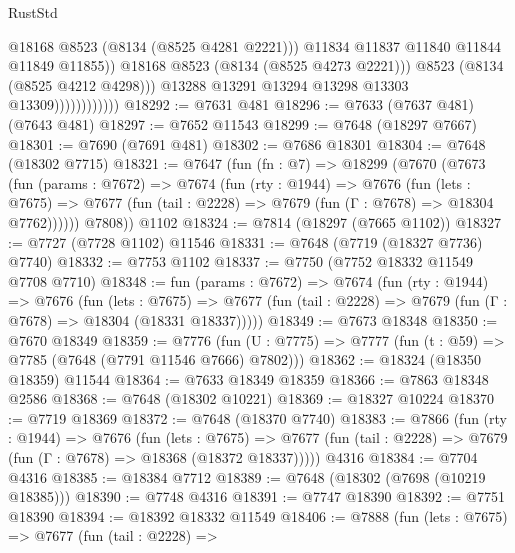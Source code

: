 \begin{lexlean}{RustStd}
\begin{coremodule}
{\begin{coremodule}
{{{{{{{{{{{{{{{{{{{{{{{{{{{{{{{{{{{{{{{{{{{{{{{{{{{{{                                      @18168
                                      @8523
                                      (@8134 (@8525 @4281 @2221)))
                                    @11834
                                    @11837
                                    @11840
                                    @11844
                                    @11849
                                    @11855))
                                @18168
                                @8523
                                (@8134 (@8525 @4273 @2221)))
                              @8523
                              (@8134 (@8525 @4212 @4298)))
                            @13288
                            @13291
                            @13294
                            @13298
                            @13303
                            @13309))))))))))))
@18292 := @7631 @481
@18296 := @7633 (@7637 @481) (@7643 @481)
@18297 := @7652 @11543
@18299 := @7648 (@18297 @7667)
@18301 := @7690 (@7691 @481)
@18302 := @7686 @18301
@18304 := @7648 (@18302 @7715)
@18321 := @7647
    (fun (fn : @7) =>
    @18299
      (@7670
        (@7673
          (fun (params : @7672) =>
          @7674
            (fun (rty : @1944) =>
            @7676
              (fun (lets : @7675) =>
              @7677 (fun (tail : @2228) => @7679 (fun (Γ : @7678) => @18304 @7762))))))
        @7808))
    @1102
@18324 := @7814 (@18297 (@7665 @1102))
@18327 := @7727 (@7728 @1102) @11546
@18331 := @7648 (@7719 (@18327 @7736) @7740)
@18332 := @7753 @1102
@18337 := @7750 (@7752 @18332 @11549 @7708 @7710)
@18348 := fun (params : @7672) =>
  @7674
    (fun (rty : @1944) =>
    @7676
      (fun (lets : @7675) =>
      @7677 (fun (tail : @2228) => @7679 (fun (Γ : @7678) => @18304 (@18331 @18337)))))
@18349 := @7673 @18348
@18350 := @7670 @18349
@18359 := @7776
    (fun (U : @7775) => @7777 (fun (t : @59) => @7785 (@7648 (@7791 @11546 @7666) @7802)))
@18362 := @18324 (@18350 @18359) @11544
@18364 := @7633 @18349 @18359
@18366 := @7863 @18348 @2586
@18368 := @7648 (@18302 @10221)
@18369 := @18327 @10224
@18370 := @7719 @18369
@18372 := @7648 (@18370 @7740)
@18383 := @7866
    (fun (rty : @1944) =>
    @7676
      (fun (lets : @7675) =>
      @7677 (fun (tail : @2228) => @7679 (fun (Γ : @7678) => @18368 (@18372 @18337)))))
    @4316
@18384 := @7704 @4316
@18385 := @18384 @7712
@18389 := @7648 (@18302 (@7698 (@10219 @18385)))
@18390 := @7748 @4316
@18391 := @7747 @18390
@18392 := @7751 @18390
@18394 := @18392 @18332 @11549
@18406 := @7888
    (fun (lets : @7675) =>
    @7677
      (fun (tail : @2228) =>
}}}}}}}}}}}}}}}}}}}}}}}}}}}}}}}}}}}}}}}}}}}}}}}}}}}}}
\end{coremodule}}
\end{coremodule}
\end{lexlean}
